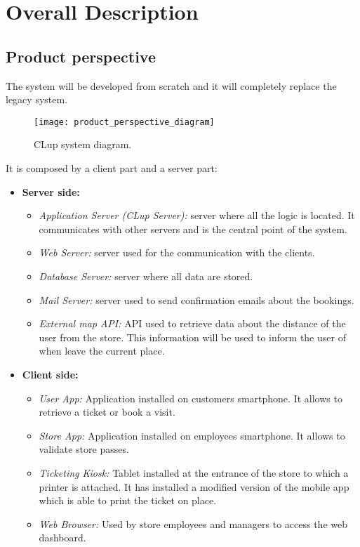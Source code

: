 \chapter{Overall Description}

\section{Product perspective}

The system will be developed from scratch and it will completely replace the legacy system. \newline

\vspace{0.8em}
\begin{figure}[H]
	\centering
	\texttt{[image: product\_perspective\_diagram]}
	\caption{CLup system diagram.}
\end{figure}


It is composed by a client part and a server part:
\begin{itemize}
	\item \textbf{Server side:}
	\begin{itemize}
		\item \textit{Application Server (CLup Server):} server where all the logic is located. It communicates with other servers and is the central point of the system.
		\item \textit{Web Server:} server used for the communication with the clients.
		\item \textit{Database Server:} server where all data are stored.
		\item \textit{Mail Server:} server used to send confirmation emails about the bookings.
		\item \textit{External map API:} API used to retrieve data about the distance of the user from the store. This information will be used to inform the user of when leave the current place.
	\end{itemize}
	\item \textbf{Client side:}
	\begin{itemize}
		\item \textit{User App:} Application installed on customers smartphone. It allows to retrieve a ticket or book a visit.
		\item \textit{Store App:} Application installed on employees smartphone. It allows to validate store passes.
		\item \textit{Ticketing Kiosk:} Tablet installed at the entrance of the store to which a printer is attached. It has installed a modified version of the mobile app which is able to print the ticket on place.
		\item \textit{Web Browser:} Used by store employees and managers to access the web dashboard.
	\end{itemize}
\end{itemize}

